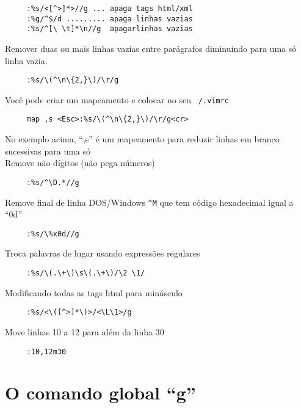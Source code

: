 \begin{verbatim}
     :%s/<[^>]*>//g ... apaga tags html/xml
     :%g/^$/d ......... apaga linhas vazias
     :%s/^[\ \t]*\n//g  apagarlinhas vazias
\end{verbatim}


Remover duas ou mais linhas vazias entre parágrafos diminuindo para
uma só linha vazia.

\begin{verbatim}
     :%s/\(^\n\{2,}\)/\r/g
\end{verbatim}

Você pode criar um mapeamento e colocar no seu {\tt ~/.vimrc}

\begin{verbatim}
     map ,s <Esc>:%s/\(^\n\{2,}\)/\r/g<cr>
\end{verbatim}

No exemplo acima, ``,s'' é um mapeamento para reduzir linhas em branco
sucessivas para uma só  \\


Remove não dígitos (não pega números)

\begin{verbatim}
     :%s/^\D.*//g
\end{verbatim}

Remove final de linha DOS/Windows \verb|^M| que tem código hexadecimal igual a
``0d''

\begin{verbatim}
     :%s/\%x0d//g
\end{verbatim}

Troca palavras de lugar usando expressões regulares

\begin{verbatim}
     :%s/\(.\+\)\s\(.\+\)/\2 \1/
\end{verbatim}

Modificando todas as tags html para minúsculo

\begin{verbatim}
     :%s/<\([^>]*\)>/<\L\1>/g
\end{verbatim}

Move linhas 10 a 12 para além da linha 30

\begin{verbatim}
     :10,12m30
\end{verbatim}

\section{O comando global ``g''}\label{sec:O comando global ``g''}

